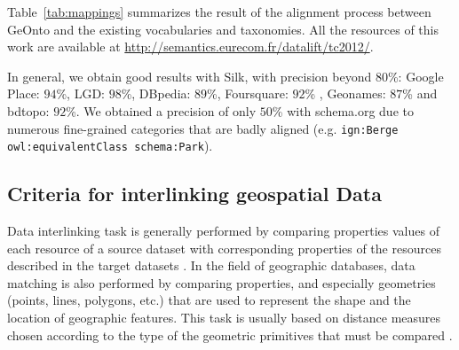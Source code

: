 Table~\ref{tab:mappings} summarizes the result of the alignment process between GeOnto and the existing vocabularies and taxonomies. All the resources of this work are available at \url{http://semantics.eurecom.fr/datalift/tc2012/}.
\begin{table}
\end{table}

In general, we obtain good results with Silk, with precision beyond $80$\%: Google Place: $94$\%, LGD: $98$\%, DBpedia: $89$\%, Foursquare: $92$\% , Geonames: $87$\% and bdtopo: $92$\%. We obtained a precision of only $50$\% with schema.org due to numerous fine-grained categories that are badly aligned (e.g. \texttt{ign:Berge owl:equivalentClass schema:Park}).


\subsection{Criteria for interlinking geospatial Data}
Data interlinking task is generally performed by comparing properties values of each resource of a source dataset with corresponding properties of the resources described in the target datasets \cite{scharffe2010}. In the field of geographic databases, data matching is also performed by comparing properties, and especially geometries (points, lines, polygons, etc.) that are used to represent the shape and the location of geographic features. This task is usually based on distance measures chosen according to the type of the geometric primitives that must be compared \cite{mustiere2008,anamaria08,Julius09,walter1999}.


